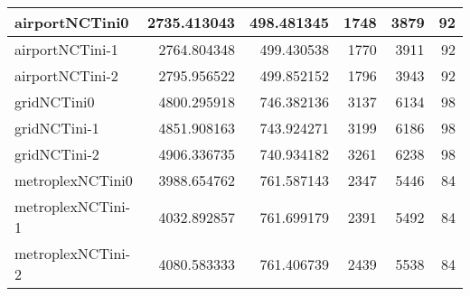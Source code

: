 \begin{longtable}{|l|r|r|r|r|r|}
airportNCTini0 & 2735.413043 & 498.481345 & 1748 & 3879 & 92 \\ \hline
airportNCTini-1 & 2764.804348 & 499.430538 & 1770 & 3911 & 92 \\ \hline
airportNCTini-2 & 2795.956522 & 499.852152 & 1796 & 3943 & 92 \\ \hline
gridNCTini0 & 4800.295918 & 746.382136 & 3137 & 6134 & 98 \\ \hline
gridNCTini-1 & 4851.908163 & 743.924271 & 3199 & 6186 & 98 \\ \hline
gridNCTini-2 & 4906.336735 & 740.934182 & 3261 & 6238 & 98 \\ \hline
metroplexNCTini0 & 3988.654762 & 761.587143 & 2347 & 5446 & 84 \\ \hline
metroplexNCTini-1 & 4032.892857 & 761.699179 & 2391 & 5492 & 84 \\ \hline
metroplexNCTini-2 & 4080.583333 & 761.406739 & 2439 & 5538 & 84 \\ \hline
\end{longtable}
